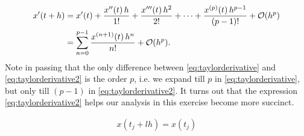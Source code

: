 \documentclass[12pt]{article}
\begin{document}
\begin{observationboxed}
\begin{align}
		x'(t+h) 
		 & = x'(t) 
		+ \frac{x''(t)\,h}{1!} + \frac{x'''(t)\,h^2}{2!} + \dots + \frac{x^{(p)}(t)\,h^{p-1}}{(p-1)!}
		+ \mathcal{O}(h^{p})
		\notag                                                                     \\
		 & = \sum_{n=0}^{p-1} \frac{x^{(n+1)}(t)\,h^{n}}{n!} + \mathcal{O}(h^{p}).
	\end{align}
	Note in passing that 
	the only difference between
	\eqref{eq:taylorderivative}
	and 
	\eqref{eq:taylorderivative2}
	is the order $p$, i.e. 
	we expand till $p$ in 
	\eqref{eq:taylorderivative},
	but only till $(p-1)$
	in \eqref{eq:taylorderivative2}.
	It turns out that the expression 
	\eqref{eq:taylorderivative2}
	helps our analysis in this exercise become more succinct.
\end{observationboxed}
\begin{align}
	x(t_j+lh) = x(t_j)
\end{align}
\end{document}
